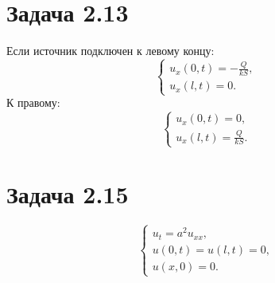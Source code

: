 \documentclass[11pt]{article}
\begin{document}
\section{Задача 2.13}
\label{sec:orgc45d354}
Если источник подключен к левому концу:
\begin{equation}
\begin{cases}
u_x(0, t) = -\frac{Q}{kS}, \\
u_x(l, t) = 0.
\end{cases}
\end{equation}
К правому:
\begin{equation}
\begin{cases}
u_x(0, t) = 0, \\
u_x(l, t) = \frac{Q}{kS}.
\end{cases}
\end{equation}
\section{Задача 2.15}
\label{sec:orgc20d3f2}
\begin{equation}
\begin{cases}
u_t = a^2u_{xx}, \\
u(0, t) = u(l, t) = 0, \\
u(x, 0) = 0.
\end{cases}
\end{equation}
\end{document}
